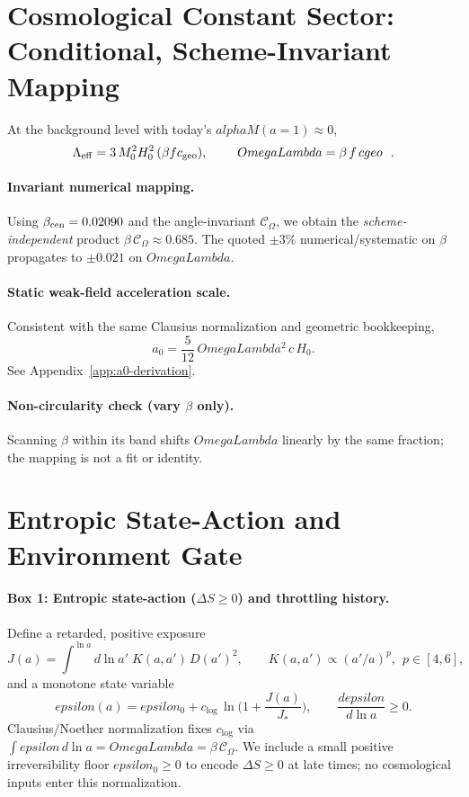 \documentclass[aps,prd,onecolumn,superscriptaddress,nofootinbib]{revtex4-2}
\def\OmL{OmegaLambda}%
\def\cgeo{cgeo}%
\def\alphaM{alphaM}%
\def\eps{epsilon}%
\def\boxed#1{#1}%
\newcommand{\OmL}{\Omega_\Lambda}
\newcommand{\cgeo}{c_{\rm geo}}
\newcommand{\alphaM}{\alpha_M}
\newcommand{\eps}{\varepsilon}
\begin{document}
\section{Cosmological Constant Sector: Conditional, Scheme-Invariant Mapping}
\label{sec:OmegaL}
At the background level with today’s $\alphaM(a{=}1)\approx 0$,
\begin{equation}
\Lambda_{\rm eff} = 3\,M_0^2 H_0^2\,(\beta f c_{\rm geo}),\qquad
\boxed{\ \OmL = \beta\, f \, \cgeo\ }\ .
\end{equation}
\paragraph*{Invariant numerical mapping.}
Using \(\beta_{\rm cen}=0.02090\) and the angle-invariant \(\mathcal C_\Omega\), we obtain the \emph{scheme-independent} product \(\beta\,\mathcal C_\Omega \approx 0.685\). The quoted \(\pm 3\%\) numerical/systematic on \(\beta\) propagates to \(\pm 0.021\) on \(\OmL\).

\paragraph*{Static weak-field acceleration scale.}
Consistent with the same Clausius normalization and geometric bookkeeping,
\begin{equation}
a_0 = \frac{5}{12}\,\OmL^2\,c\,H_0.
\end{equation}
See Appendix~\ref{app:a0-derivation}.

\paragraph*{Non-circularity check (vary $\beta$ only).}
Scanning $\beta$ within its band shifts $\OmL$ linearly by the same fraction; the mapping is not a fit or identity.

\section{Entropic State-Action and Environment Gate}
\label{sec:state-action}

\paragraph*{Box 1: Entropic state-action ($\Delta S\ge 0$) and throttling history.}
Define a retarded, positive exposure
\begin{equation}
J(a)=\int^{\ln a}\!d\ln a'\;K(a,a')\,D(a')^2,\qquad K(a,a')\propto (a'/a)^p,\ \ p\in[4,6],
\end{equation}
and a monotone state variable
\begin{equation}
\eps(a)=\eps_0+c_{\log}\,\ln\!\Big(1+\frac{J(a)}{J_*}\Big),\qquad \frac{d\eps}{d\ln a}\ge 0.
\end{equation}
Clausius/Noether normalization fixes $c_{\log}$ via $\int \eps\,d\ln a=\OmL=\beta\,\mathcal C_\Omega$. We include a small positive irreversibility floor $\eps_0\ge 0$ to encode $\Delta S\ge 0$ at late times; no cosmological inputs enter this normalization.
\end{document}
